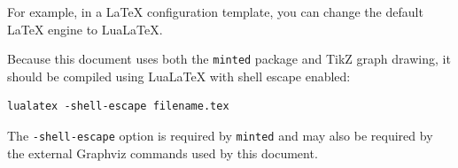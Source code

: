 \documentclass[a4paper]{article}
\begin{document}
                For example, in a LaTeX configuration template, you can change the default
                LaTeX engine to LuaLaTeX.
                
                Because this document uses both the \texttt{minted} package and TikZ graph
                drawing, it should be compiled using LuaLaTeX with shell escape enabled:
            
            \begin{verbatim}
lualatex -shell-escape filename.tex
                \end{verbatim}
                
                The \texttt{-shell-escape} option is required by \texttt{minted} and may also
                be required by the external Graphviz commands used by this document.
                
                
                
\end{document}
